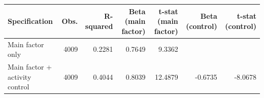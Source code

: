 \begin{tabular}{lrrrrrr}
\toprule
Specification & Obs. & R-squared & Beta (main factor) & t-stat (main factor) & Beta (control) & t-stat (control) \\
\midrule
Main factor only & 4009 & 0.2281 & 0.7649 & 9.3362 &  &  \\
Main factor + activity control & 4009 & 0.4044 & 0.8039 & 12.4879 & -0.6735 & -8.0678 \\
\bottomrule
\end{tabular}
